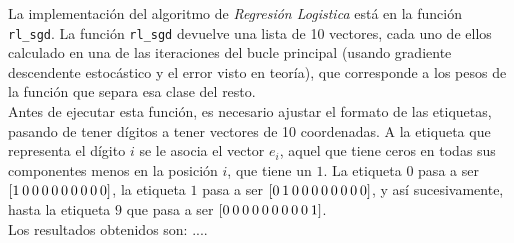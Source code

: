 \documentclass{article}
\begin{document}
La implementación del algoritmo de \textit{Regresión Logistica} está en la función \texttt{rl\_sgd}. La función \texttt{rl\_sgd} devuelve una lista de 10 vectores, cada uno de ellos calculado en una de las iteraciones del bucle principal (usando gradiente descendente estocástico y el error visto en teoría), que corresponde a los pesos de la función que separa esa clase del resto.\\
Antes de ejecutar esta función, es necesario ajustar el formato de las etiquetas, pasando de tener dígitos a tener vectores de 10 coordenadas. A la etiqueta que representa el dígito $i$ se le asocia el vector $e_i$, aquel que tiene ceros en todas sus componentes menos en la posición $i$, que tiene un $1$. La etiqueta $0$ pasa a ser $[1 \hspace{0.7mm} 0 \hspace{0.7mm} 0 \hspace{0.7mm} 0 \hspace{0.7mm} 0 \hspace{0.7mm} 0 \hspace{0.7mm} 0 \hspace{0.7mm} 0 \hspace{0.7mm} 0 \hspace{0.7mm} 0]$, la etiqueta $1$ pasa a ser $[0 \hspace{0.7mm} 1 \hspace{0.7mm} 0 \hspace{0.7mm} 0 \hspace{0.7mm} 0 \hspace{0.7mm} 0 \hspace{0.7mm} 0 \hspace{0.7mm} 0 \hspace{0.7mm} 0 \hspace{0.7mm} 0]$, y así sucesivamente, hasta la etiqueta $9$  que pasa a ser $[0 \hspace{0.7mm} 0 \hspace{0.7mm} 0 \hspace{0.7mm} 0 \hspace{0.7mm} 0 \hspace{0.7mm} 0 \hspace{0.7mm} 0 \hspace{0.7mm} 0 \hspace{0.7mm} 0 \hspace{0.7mm} 1]$.\\

Los resultados obtenidos son: ....\\
\end{document}
